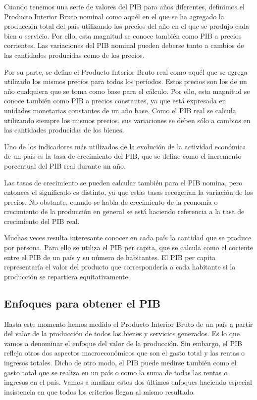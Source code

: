 \documentclass[
]{krantz}
\begin{document}
Cuando tenemos una serie de valores del PIB para años diferentes, definimos el Producto Interior Bruto nominal como aquél en el que se ha agregado la producción total del país utilizando los precios del año en el que se produjo cada bien o servicio. Por ello, esta magnitud se conoce también como PIB a precios corrientes. Las variaciones del PIB nominal pueden deberse tanto a cambios de las cantidades producidas como de los precios.

Por su parte, se define el Producto Interior Bruto real como aquél que se agrega utilizado los mismos precios para todos los períodos. Estos precios son los de un año cualquiera que se toma como base para el cálculo. Por ello, esta magnitud se conoce también como PIB a precios constantes, ya que está expresada en unidades monetarias constantes de un año base. Como el PIB real se calcula utilizando siempre los mismos precios, sus variaciones se deben sólo a cambios en las cantidades producidas de los bienes.

Uno de los indicadores más utilizados de la evolución de la actividad económica de un país es la tasa de crecimiento del PIB, que se define como el incremento porcentual del PIB real durante un año.

Las tasas de crecimiento se pueden calcular también para el PIB nomina, pero entonces el significado es distinto, ya que estas tasas recogerían la variación de los precios. No obstante, cuando se habla de crecimiento de la economía o crecimiento de la producción en general se está haciendo referencia a la tasa de crecimiento del PIB real.

Muchas veces resulta interesante conocer en cada país la cantidad que se produce por persona. Para ello se utiliza el PIB per capita, que se calcula como el cociente entre el PIB de un país y su número de habitantes. El PIB per capita representaría el valor del producto que correspondería a cada habitante si la producción se repartiera equitativamente.

\hypertarget{enfoques-para-obtener-el-pib}{%
\subsection{Enfoques para obtener el PIB}\label{enfoques-para-obtener-el-pib}}

Hasta este momento hemos medido el Producto Interior Bruto de un país a partir del valor de la producción de todos los bienes y servicios generados. Es lo que vamos a denominar el enfoque del valor de la producción. Sin embargo, el PIB refleja otros dos aspectos macroeconómicos que son el gasto total y las rentas o ingresos totales. Dicho de otro modo, el PIB puede medirse también como el gasto total que se realiza en un país o como la suma de todas las rentas o ingresos en el país. Vamos a analizar estos dos últimos enfoques haciendo especial insistencia en que todos los criterios llegan al mismo resultado.
\end{document}
